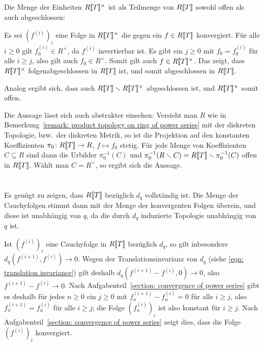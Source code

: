 \documentclass[a4paper, 10pt, numbers=noenddot]{scrartcl}
\begin{document}
\begin{remark}
  Die Menge der Einheiten $R[\![T]\!]^\times$ ist als Teilmenge von $R[\![T]\!]$ sowohl offen als auch abgeschlossen:
  
  Es sei $(f^{(i)})_i$ eine Folge in $R[\![T]\!]^\times$ die gegen ein $f \in R[\![T]\!]$ konvergiert.
  Für alle $i \geq 0$ gilt $f^{(i)}_0 \in R^\times$, da $f^{(i)}$ invertierbar ist.
  Es gibt ein $j \geq 0$ mit $f_0 = f^{(i)}_0$ für alle $i \geq j$, also gilt auch $f_0 \in R^\times$.
  Somit gilt auch $f \in R[\![T]\!]^\times$.
  Das zeigt, dass $R[\![T]\!]^\times$ folgenabgeschlossen in $R[\![T]\!]$ ist, und somit abgeschlossen in $R[\![T]\!]$.
  
  Analog ergibt sich, dass auch $R[\![T]\!] \smallsetminus R[\![T]\!]^\times$ abgeschlossen ist, und $R[\![T]\!]^\times$ somit offen.
  
  Die Aussage lässt sich auch abstrakter einsehen:
  Versieht man $R$ wie in Bemerkung~\ref{remark: product topology on ring of power series} mit der diskreten Topologie, bzw.\ der diskreten Metrik, so ist die Projektion auf den konstanten Koeffizienten $\pi_0 \colon R[\![T]\!] \to R$, $f \mapsto f_0$ stetig.
  Für jede Menge von Koeffizienten $C \subseteq R$ sind dann die Urbilder $\pi_0^{-1}(C)$ und $\pi_0^{-1}(R \smallsetminus C) = R[\![T]\!] \smallsetminus \pi_0^{-1}(C)$ offen in $R[\![T]\!]$.
  Wählt man $C = R^\times$, so ergibt sich die Aussage.
\end{remark}





\section{}

Es genügt zu zeigen, dass $R[\![T]\!]$ bezüglich $d_q$ vollständig ist.
Die Menge der Cauchyfolgen stimmt dann mit der Menge der konvergenten Folgen überein, und diese ist unabhängig von $q$, da die durch $d_q$ induzierte Topologie unabhängig von $q$ ist.

Ist $(f^{(i)})_i$ eine Cauchyfolge in $R[\![T]\!]$ bezüglich $d_q$, so gilt inbesondere $d_q(f^{(i+1)}, f^{(i)}) \to 0$.
Wegen der Translationsinvarianz von $d_q$ (siehe \eqref{eqn: translation invariance}) gilt deshalb $d_q(f^{(i+1)} - f^{(i)}, 0) \to 0$, also $f^{(i+1)} - f^{(i)} \to 0$.
Nach Aufgabenteil~\ref{section: convergence of power series} gibt es deshalb für jedes $n \geq 0$ ein $j \geq 0$ mit $f^{(i+1)}_n - f^{(i)}_n = 0$ für alle $i \geq j$, also $f^{(i+1)}_n = f^{(i)}_n$ für alle $i \geq j$;
die Folge $(f^{(i)}_n)_i$ ist also konstant für $i \geq j$.
Nach Aufgabenteil~\ref{section: convergence of power series} zeigt dies, dass die Folge $(f^{(i)})_i$ konvergiert.
\end{document}
